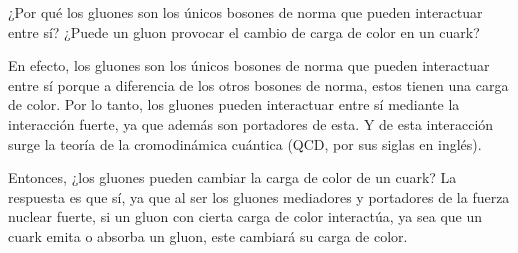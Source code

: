 \documentclass[./../main.tex]{subfiles}
\begin{document}
	\begin{exercise}
		¿Por qué los gluones son los únicos bosones de norma que pueden interactuar entre sí? ¿Puede un gluon provocar el cambio de carga de color en un cuark?

		\begin{solution}
			En efecto, los gluones son los únicos bosones de norma que pueden interactuar entre sí porque a diferencia de los otros bosones de norma, estos tienen una carga de color. Por lo tanto, los gluones pueden interactuar entre sí mediante la interacción fuerte, ya que además son portadores de esta. Y de esta interacción surge la teoría de la cromodinámica cuántica (QCD, por sus siglas en inglés).

			Entonces, ¿los gluones pueden cambiar la carga de color de un cuark? La respuesta es que sí, ya que al ser los gluones mediadores y portadores de la fuerza nuclear fuerte, si un gluon con cierta carga de color interactúa, ya sea que un cuark emita o absorba un gluon, este cambiará su carga de color.
		\end{solution}
	\end{exercise}
\end{document}
